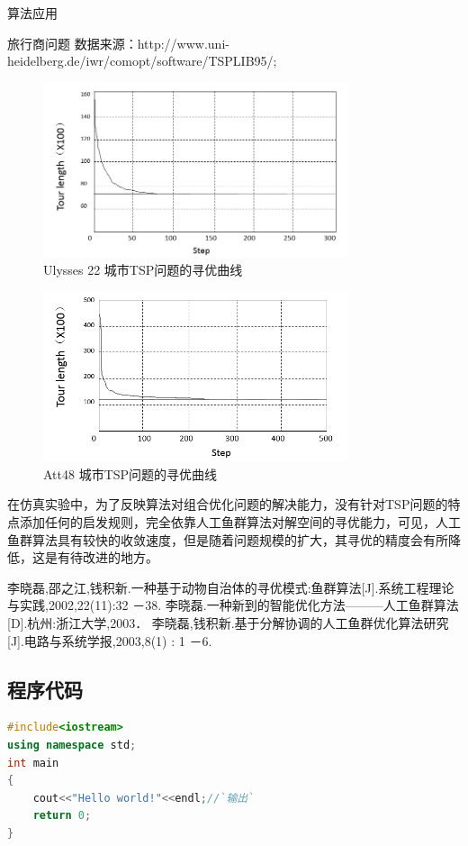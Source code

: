 \documentclass[UTF8]{ctexart}
\begin{document}
\begin{section}{算法应用}
\begin{subsection}{旅行商问题}
	数据来源：http://www.uni-heidelberg.de/iwr/comopt/software/TSPLIB95/;
	\begin{figure}[htbp]
		\centering
		\includegraphics[width=0.8\textwidth]{../../pic/fish4.png}
		\caption{Ulysses 22 城市TSP问题的寻优曲线}
	\end{figure}
	\begin{figure}[htbp]
		\centering
		\includegraphics[width=0.8\textwidth]{../../pic/fish5.png}
		\caption{Att48 城市TSP问题的寻优曲线}
	\end{figure}
在仿真实验中，为了反映算法对组合优化问题的解决能力，没有针对TSP问题的特点添加任何的启发规则，完全依靠人工鱼群算法对解空间的寻优能力，可见，人工鱼群算法具有较快的收敛速度，但是随着问题规模的扩大，其寻优的精度会有所降低，这是有待改进的地方。
\end{subsection}



\end{section}


\begin{thebibliography}{123} 
 李晓磊,邵之江,钱积新.一种基于动物自治体的寻优模式:鱼群算法[J].系统工程理论与实践,2002,22(11):32 －38.
 李晓磊.一种新到的智能优化方法———人工鱼群算法[D].杭州:浙江大学,2003．
李晓磊,钱积新.基于分解协调的人工鱼群优化算法研究[J].电路与系统学报,2003,8(1) : 1 －6.
\end{thebibliography}

\newpage
\begin{appendices}
\section{程序代码}
\begin{lstlisting}[language=C++,escapeinside=``]
#include<iostream>
using namespace std;
int main
{
	cout<<"Hello world!"<<endl;//`输出`
	return 0;
}
\end{lstlisting}
\end{appendices}
	
\end{document}
